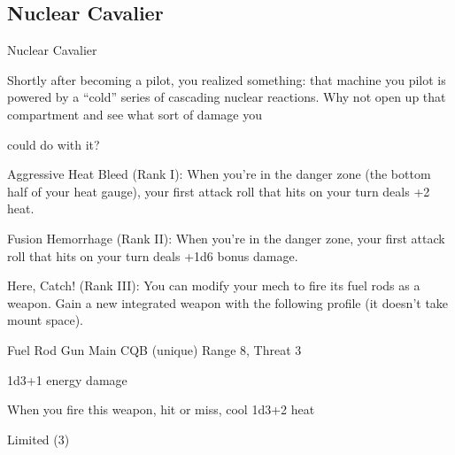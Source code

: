 \subsection{Nuclear Cavalier}

                                             Nuclear Cavalier

Shortly after becoming a pilot, you realized something: that machine you pilot is powered by a “cold” series
of cascading nuclear reactions. Why not open up that compartment and see what sort of damage you

could do with it?

Aggressive Heat Bleed  (Rank I): When you’re in the danger zone (the bottom half of your heat
gauge), your first attack roll that hits on your turn deals +2 heat.

Fusion Hemorrhage (Rank II): When you’re in the danger zone, your first attack roll that hits on
your turn deals +1d6 bonus damage.

Here, Catch! (Rank III): You can modify your mech to fire its fuel rods as a weapon. Gain a new
integrated weapon with the following profile (it doesn’t take mount space).

         Fuel Rod Gun
         Main CQB (unique)
         Range 8, Threat 3

         1d3+1 energy damage

         When you fire this weapon, hit or miss, cool 1d3+2 heat

         Limited (3)